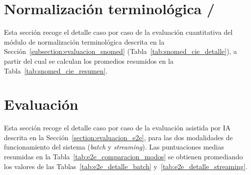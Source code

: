 



\section{Normalización terminológica /}\label{anexo:resultados_snomed_cie_completos}

Esta sección recoge el detalle caso por caso de la evaluación cuantitativa del módulo de
normalización terminológica descrita en la Sección~\ref{subsection:evaluacion_snomed}
(Tabla~\ref{tab:snomed_cie_detalle}), a partir del cual se calculan los promedios resumidos en la
Tabla~\ref{tab:snomed_cie_resumen}.



\section{Evaluación }\label{anexo:resultados_e2e_completos}

Esta sección recoge el detalle caso por caso de la evaluación  asistida por
IA descrita en la Sección~\ref{section:evaluacion_e2e}, para las dos modalidades de funcionamiento
del sistema (\textit{batch} y \textit{streaming}). Las puntuaciones medias resumidas en la
Tabla~\ref{tab:e2e_comparacion_modos} se obtienen promediando los valores de las
Tablas~\ref{tab:e2e_detalle_batch} y~\ref{tab:e2e_detalle_streaming}.



